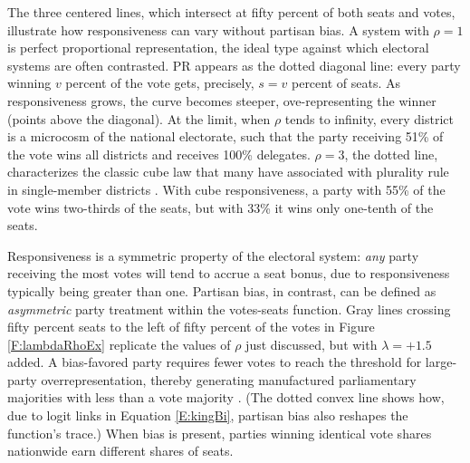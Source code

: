 \documentclass[letter,12pt]{article}
\begin{document}
The three centered lines, which intersect at fifty percent of both seats and votes, illustrate how responsiveness can vary without partisan bias. A system with $\rho=1$ is perfect proportional representation, the ideal type against which electoral systems are often contrasted. PR appears as the dotted diagonal line: every party winning $v$ percent of the vote gets, precisely, $s=v$ percent of seats. As responsiveness grows, the curve becomes steeper, ove-representing the winner (points above the diagonal). At the limit, when $\rho$ tends to infinity, every district is a microcosm of the national electorate, such that the party receiving 51\% of the vote wins all districts and receives 100\% delegates. $\rho=3$, the dotted line, characterizes the classic cube law that many have associated with plurality rule in single-member districts \citep{taagepera.CubeLaw.1973}. With cube responsiveness, a party with 55\% of the vote wins two-thirds of the seats, but with 33\% it wins only one-tenth of the seats. 

Responsiveness is a symmetric property of the electoral system: \emph{any} party receiving the most votes will tend to accrue a seat bonus, due to responsiveness typically being greater than one. Partisan bias, in contrast, can be defined as \emph{asymmetric} party treatment within the votes-seats function. Gray lines crossing fifty percent seats to the left of fifty percent of the votes in Figure \ref{F:lambdaRhoEx} replicate the values of $\rho$ just discussed, but with $\lambda = +1.5$ added. A bias-favored party requires fewer votes to reach the threshold for large-party overrepresentation, thereby generating manufactured parliamentary majorities with less than a vote majority \citep{lijphartElSysPtySys.1994}. (The dotted convex line shows how, due to logit links in Equation \ref{E:kingBi}, partisan bias also reshapes the function's trace.) When bias is present, parties winning identical vote shares nationwide earn different shares of seats. 

\end{document}
